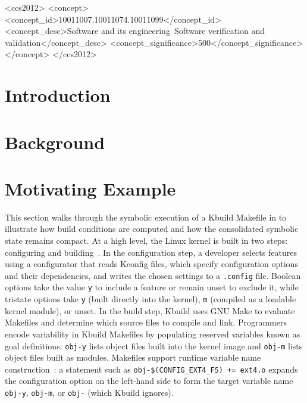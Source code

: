 \documentclass[acmsmall,screen,review,anonymous,nonacm]{acmart}
\begin{document}
\begin{CCSXML}
<ccs2012>
<concept>
<concept_id>10011007.10011074.10011099</concept_id>
<concept_desc>Software and its engineering~Software verification and validation</concept_desc>
<concept_significance>500</concept_significance>
</concept>
</ccs2012>
\end{CCSXML}

\maketitle

\section{Introduction}
  \label{sec:intro}

\section{Background}
  \label{sec:background}

\section{Motivating Example}
  \label{sec:example}
  This section walks through the symbolic execution of a Kbuild Makefile in \tool{} to illustrate how build conditions are computed and how the consolidated symbolic state remains compact.
  At a high level, the Linux kernel is built in two steps: configuring and building~\cite{nguyen2020kbuild}.
  In the configuration step, a developer selects features using a configurator that reads Kconfig files, which specify configuration options and their dependencies, and writes the chosen settings to a \texttt{.config} file.
  Boolean options take the value \texttt{y} to include a feature or remain unset to exclude it, while tristate options take \texttt{y} (built directly into the kernel), \texttt{m} (compiled as a loadable kernel module), or unset.
  In the build step, Kbuild uses GNU Make to evaluate Makefiles and determine which source files to compile and link.
  Programmers encode variability in Kbuild Makefiles by populating reserved variables known as goal definitions: \texttt{obj-y} lists object files built into the kernel image and \texttt{obj-m} lists object files built as modules.
  Makefiles support runtime variable name construction~\cite{gazzillo2017kmax}: a statement such as \texttt{obj-\$(CONFIG\_EXT4\_FS) += ext4.o} expands the configuration option on the left-hand side to form the target variable name \texttt{obj-y}, \texttt{obj-m}, or \texttt{obj-} (which Kbuild ignores).
\end{document}
